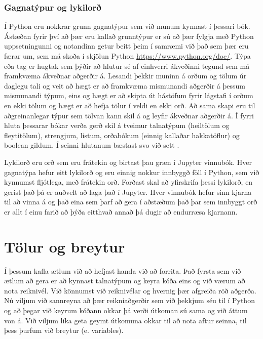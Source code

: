 \documentclass[11pt,fleqn]{book} %
\begin{document}
\subsection{Gagnatýpur og lykilorð}

Í Python eru nokkrar grunn gagnatýpur sem við munum kynnast í þessari bók. 
Ástæðan fyrir því að þær eru kallað grunntýpur er sú að þær fylgja með Python uppsetningunni og notandinn getur beitt þeim í samræmi við það sem þær eru færar um, sem má skoða í skjölun Python \href{https://www.python.org/doc/}{https://www.python.org/doc/}. 
Týpa eða tag er hugtak sem þýðir að hlutur sé af einhverri ákveðinni tegund sem má framkvæma ákveðnar aðgerðir á. 
Lesandi þekkir muninn á orðum og tölum úr daglegu tali og veit að hægt er að framkvæma mismunandi aðgerðir á þessum mismunandi týpum, eins og hægt er að skipta út hástöfum fyrir lágstafi í orðum en ekki tölum og hægt er að hefja tölur í veldi en ekki orð. 
Að sama skapi eru til aðgreinanlegar týpur sem tölvan kann skil á og leyfir ákveðnar aðgerðir á.
Í fyrri hluta þessarar bókar verða gerð skil á tveimur talnatýpum (heiltölum og fleytitölum), strengjum, listum, orðabókum (einnig kallaðar hakkatöflur) og boolean gildum. 
Í seinni hlutanum bæstast svo við sett .

Lykilorð eru orð sem eru frátekin og birtast þau græn í Jupyter vinnubók. 
Hver gagnatýpa hefur eitt lykilorð og eru einnig nokkur innbyggð föll í Python, sem við kynnumst fljótlega, með frátekin orð. 
Forðast skal að yfirskrifa þessi lykilorð, en gerist það þá er auðvelt að laga það í Jupyter. 
Hver vinnubók hefur sinn kjarna til að vinna á og það eina sem þarf að gera í aðstæðum það þar sem innbyggt orð er allt í einu farið að þýða eitthvað annað þá dugir að endurræsa kjarnann. 

\chapter{Tölur og breytur}
Í þessum kafla ætlum við að hefjast handa við að forrita. 
Það fyrsta sem við ætlum að gera er að kynnast talnatýpum og keyra kóða eins og við værum að nota reiknivél. 
Við könnumst við reiknivélar og hvernig þær afgreiða röð aðgerða. 
Nú viljum við sannreyna að þær reikniaðgerðir sem við þekkjum séu til í Python og að þegar við keyrum kóðann okkar þá verði útkoman sú sama og við áttum von á. 
Við viljum líka geta geymt útkomuna okkar til að nota aftur seinna, til þess þurfum við breytur (e. variables).
\end{document}
